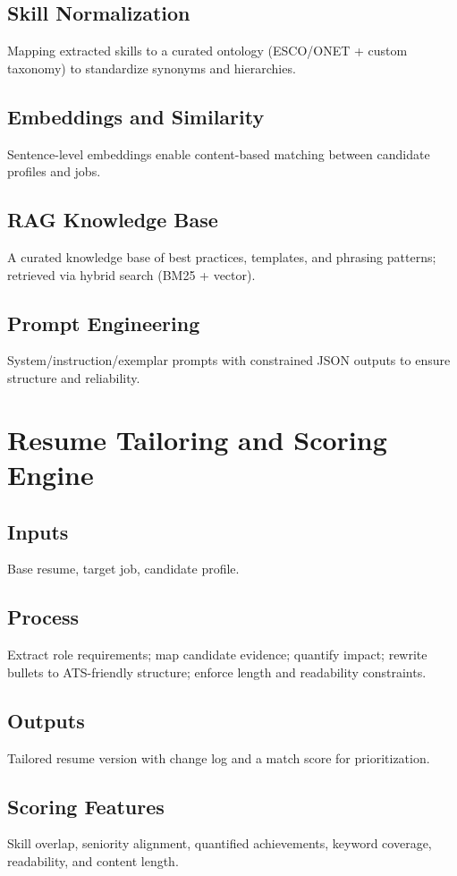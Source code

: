 \documentclass[12pt,a4paper]{article}
\begin{document}
\subsection{Skill Normalization}
Mapping extracted skills to a curated ontology (ESCO/ONET + custom taxonomy) to standardize synonyms and hierarchies.
\subsection{Embeddings and Similarity}
Sentence-level embeddings enable content-based matching between candidate profiles and jobs.
\subsection{RAG Knowledge Base}
A curated knowledge base of best practices, templates, and phrasing patterns; retrieved via hybrid search (BM25 + vector).
\subsection{Prompt Engineering}
System/instruction/exemplar prompts with constrained JSON outputs to ensure structure and reliability.

\section{Resume Tailoring and Scoring Engine}
\subsection{Inputs}
Base resume, target job, candidate profile.
\subsection{Process}
Extract role requirements; map candidate evidence; quantify impact; rewrite bullets to ATS-friendly structure; enforce length and readability constraints.
\subsection{Outputs}
Tailored resume version with change log and a match score for prioritization.
\subsection{Scoring Features}
Skill overlap, seniority alignment, quantified achievements, keyword coverage, readability, and content length.
\end{document}
